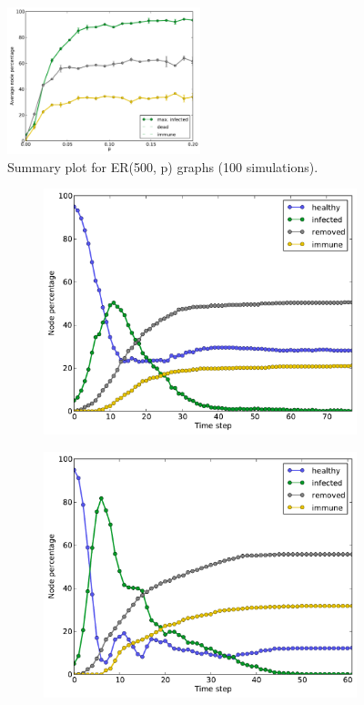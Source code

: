 \documentclass[11pt]{article} %
\begin{document}
\begin{figure}
  \centering
  \includegraphics[width=0.5\textwidth]{figures/sum_ER_500_p}
  \caption{Summary plot for ER(500, p) graphs (100 simulations).}
  \label{fig:er_sum}
\end{figure}

\begin{figure}[tb]
  \begin{subfigure}[b]{0.5\textwidth}
    \centering
    \includegraphics[width=\textwidth]{figures/evo_WS_500_15_01}
  \end{subfigure}
  \begin{subfigure}[b]{0.5\textwidth}
    \centering
    \includegraphics[width=\textwidth]{figures/evo_WS_500_30_01}

\end{subfigure}
\end{figure}
\end{document}
